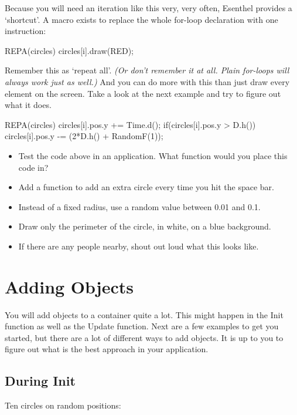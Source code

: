 Because you will need an iteration like this very, very often, Esenthel provides a `shortcut'. A macro  exists to replace the whole for-loop declaration with one instruction:

\begin{code}
REPA(circles)
{
  circles[i].draw(RED);
}
\end{code}

Remember this as `repeat all'. \textit{(Or don't remember it at all. Plain for-loops will always work just as well.)} And you can do more with this than just draw every element on the screen. Take a look at the next example and try to figure out what it does.

\begin{code}
REPA(circles)
{
	circles[i].pos.y += Time.d();
	if(circles[i].pos.y > D.h()) {
	  circles[i].pos.y -= (2*D.h() + RandomF(1));
	}
}
\end{code}

\begin{exercise}
\begin{itemize}
\item Test the code above in an application. What function would you place this code in?
\item Add a function to add an extra circle every time you hit the space bar.
\item Instead of a fixed radius, use a random value between 0.01 and 0.1.
\item Draw only the perimeter of the circle, in white, on a blue background.
\item If there are any people nearby, shout out loud what this looks like.
\end{itemize}
\end{exercise}

\section{Adding Objects}
You will add objects to a container quite a lot. This might happen in the Init function as well as the Update function. Next are a few examples to get you started, but there are a lot of different ways to add objects. It is up to you to figure out what is the best approach in your application.

\subsection{During Init}

Ten circles on random positions:

